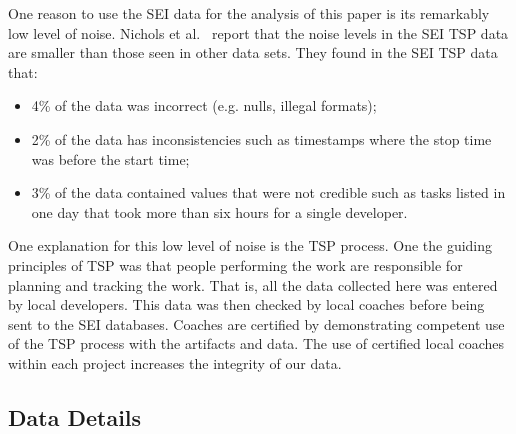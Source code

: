 \documentclass[smallcondesed]{svjour3}
\newcommand{\bi}{\begin{itemize}}%
\newcommand{\ei}{\end{itemize}}
\begin{document}
One reason to use the SEI data for the analysis of this paper is its remarkably low level of noise.
Nichols et al.~\cite{shirai14}  report that
the noise levels in the SEI TSP data are smaller than those seen
in other data sets. They found in the SEI TSP data that:\bi 
\item
4\% of the data was incorrect (e.g. nulls, illegal formats);
\item  2\% of the data has inconsistencies such as timestamps
where the stop time was before the start time;
\item 3\% of the data contained values that were not credible
such as tasks listed in one day that took more than six hours for a single developer.
\ei 
One explanation for this low level of noise is the TSP process.
One the guiding principles of TSP was that  people performing the work are  responsible for planning and tracking the work. That is,  all the data collected here was entered
by local developers. This data was then checked by local coaches before being sent to the SEI
databases. Coaches are certified by demonstrating competent use of the TSP process with the artifacts and data.
The use of certified local coaches within each project increases the integrity of our data.


\subsection{Data Details}
\label{sec:data-collection}

\end{document}
